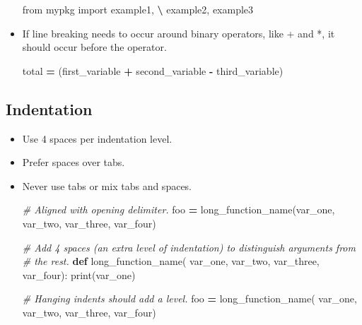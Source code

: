 \documentclass[
]{book}
\newenvironment{Shaded}{\begin{snugshade}}{\end{snugshade}}
\newcommand{\BuiltInTok}[1]{#1}
\newcommand{\CommentTok}[1]{\textcolor[rgb]{0.56,0.35,0.01}{\textit{#1}}}
\newcommand{\ImportTok}[1]{#1}
\newcommand{\KeywordTok}[1]{\textcolor[rgb]{0.13,0.29,0.53}{\textbf{#1}}}
\newcommand{\NormalTok}[1]{#1}
\newcommand{\OperatorTok}[1]{\textcolor[rgb]{0.81,0.36,0.00}{\textbf{#1}}}
\begin{document}
\begin{itemize}
\begin{Shaded}
\begin{Highlighting}[]
\ImportTok{from}\NormalTok{ mypkg }\ImportTok{import}\NormalTok{ example1, }\OperatorTok{\textbackslash{}}
\NormalTok{    example2, example3}
\end{Highlighting}
\end{Shaded}
\item
  If line breaking needs to occur around binary operators, like + and *, it
  should occur before the operator.

\begin{Shaded}
\begin{Highlighting}[]
\NormalTok{total }\OperatorTok{=}\NormalTok{ (first_variable}
         \OperatorTok{+}\NormalTok{ second_variable}
         \OperatorTok{-}\NormalTok{ third_variable)}
\end{Highlighting}
\end{Shaded}
\end{itemize}

\hypertarget{indentation}{%
\subsection{Indentation}\label{indentation}}

\begin{itemize}
\item
  Use 4 spaces per indentation level.
\item
  Prefer spaces over tabs.
\item
  Never use tabs or mix tabs and spaces.

\begin{Shaded}
\begin{Highlighting}[]
\CommentTok{# Aligned with opening delimiter.}
\NormalTok{foo }\OperatorTok{=}\NormalTok{ long_function_name(var_one, var_two,}
\NormalTok{                         var_three, var_four)}

\CommentTok{# Add 4 spaces (an extra level of indentation) to distinguish arguments from }
\CommentTok{# the rest.}
\KeywordTok{def}\NormalTok{ long_function_name(}
\NormalTok{        var_one, var_two, var_three,}
\NormalTok{        var_four):}
    \BuiltInTok{print}\NormalTok{(var_one)}

\CommentTok{# Hanging indents should add a level.}
\NormalTok{foo }\OperatorTok{=}\NormalTok{ long_function_name(}
\NormalTok{    var_one, var_two,}
\NormalTok{    var_three, var_four)}
\end{Highlighting}
\end{Shaded}
\end{itemize}
\end{document}
